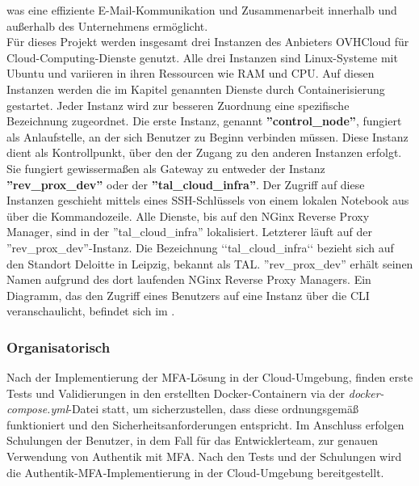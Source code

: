 was eine effiziente E-Mail-Kommunikation und Zusammenarbeit innerhalb und außerhalb des Unternehmens ermöglicht.
\\Für dieses Projekt werden insgesamt drei Instanzen des Anbieters OVHCloud für Cloud-Computing-Dienste genutzt. 
Alle drei Instanzen sind Linux-Systeme mit Ubuntu und variieren in ihren Ressourcen wie RAM und CPU. Auf 
diesen Instanzen werden die im Kapitel genannten Dienste durch Containerisierung gestartet. Jeder Instanz 
wird zur besseren Zuordnung eine spezifische Bezeichnung zugeordnet.
Die erste Instanz, genannt \textbf{''control\_node''}, fungiert als Anlaufstelle, an der sich Benutzer zu Beginn verbinden müssen.
Diese Instanz dient als Kontrollpunkt, über den der Zugang zu den anderen Instanzen erfolgt. Sie fungiert 
gewissermaßen als Gateway zu entweder der Instanz \textbf{''rev\_prox\_dev''} oder der \textbf{''tal\_cloud\_infra''}. 
Der Zugriff auf diese Instanzen geschieht mittels eines \acs{SSH}-Schlüssels von einem lokalen Notebook aus über die Kommandozeile.
Alle Dienste, bis auf den NGinx Reverse Proxy Manager, sind in der ''tal\_cloud\_infra'' lokalisiert. 
Letzterer läuft auf der ''rev\_prox\_dev''-Instanz. Die Bezeichnung ‘‘tal\_cloud\_infra‘‘ bezieht sich auf den Standort Deloitte in Leipzig, bekannt als \acs{TAL}. 
''rev\_prox\_dev'' erhält seinen Namen aufgrund des dort laufenden NGinx Reverse Proxy Managers. Ein Diagramm, das den Zugriff eines Benutzers auf eine Instanz  
über die CLI veranschaulicht, befindet sich im  .


\subsubsection{Organisatorisch}
\label{sec:Organisatorisch}
Nach der Implementierung der MFA-Lösung in der Cloud-Umgebung, finden erste Tests und Validierungen in den erstellten 
Docker-Containern via der \textit{docker-compose.yml}-Datei statt, um sicherzustellen, dass diese ordnungsgemäß funktioniert und den 
Sicherheitsanforderungen entspricht. 
Im Anschluss erfolgen Schulungen der Benutzer, in dem Fall für das Entwicklerteam, zur genauen Verwendung von Authentik mit \acs{MFA}. 
Nach den Tests und der Schulungen wird die Authentik-\acs{MFA}-Implementierung in der Cloud-Umgebung bereitgestellt.

